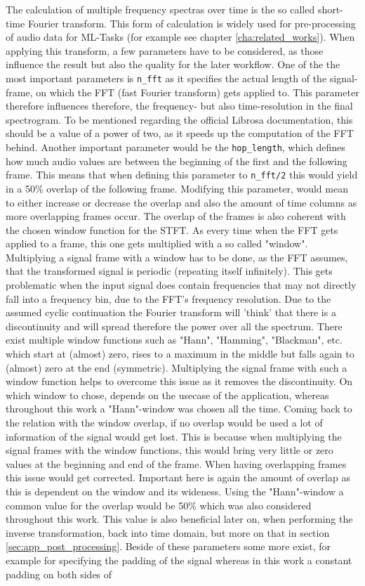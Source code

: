 The calculation of multiple frequency spectras over time is the so called short-time Fourier transform. This form of calculation is widely used for pre-processing of audio data for ML-Tasks (for example see chapter \ref{cha:related_works}). When applying this transform, a few parameters have to be considered, as those influence the result but also the quality for the later workflow. One of the the most important parameters is \texttt{n\_fft} as it specifies the actual length of the signal-frame, on which the FFT (fast Fourier transform) gets applied to. This parameter therefore influences therefore, the frequency- but also time-resolution in the final spectrogram. To be mentioned regarding the official Librosa documentation, this should be a value of a power of two, as it speeds up the computation of the FFT behind. Another important parameter would be the \texttt{hop\_length}, which defines how much audio values are between the beginning of the first and the following frame. This means that when defining this parameter to \texttt{n\_fft/2} this would yield in a 50\% overlap of the following frame. Modifying this parameter, would mean to either increase or decrease the overlap and also the amount of time columns as more overlapping frames occur. The overlap of the frames is also coherent with the chosen window function for the STFT. As every time when the FFT gets applied to a frame, this one gets multiplied with a so called "window". Multiplying a signal frame with a window has to be done, as the FFT assumes, that the transformed signal is periodic (repeating itself infinitely). \cite{heinzel2002spectrum} This gets problematic when the input signal does contain frequencies that may not directly fall into a frequency bin, due to the FFT's frequency resolution. Due to the assumed cyclic continuation the Fourier transform will 'think' that there is a discontinuity and will spread therefore the power over all the spectrum. There exist multiple window functions such as "Hann", "Hamming", "Blackman", etc. which start at (almost) zero, rises to a maximum in the middle but falls again to (almost) zero at the end (symmetric). Multiplying the signal frame with such a window function helps to overcome this issue as it removes the discontinuity. On which window to chose, depends on the usecase of the application, whereas throughout this work a "Hann"-window was chosen all the time. Coming back to the relation with the window overlap, if no overlap would be used a lot of information of the signal would get lost. This is because when multiplying the signal frames with the window functions, this would bring very little or zero values at the beginning and end of the frame. \cite{heinzel2002spectrum} When having overlapping frames this issue would get corrected. Important here is again the amount of overlap as this is dependent on the window and its wideness. Using the "Hann"-window a common value for the overlap would be 50\% which was also considered throughout this work. This value is also beneficial later on, when performing the inverse transformation, back into time domain, but more on that in section \ref{sec:app_post_processing}. Beside of these parameters some more exist, for example for specifying the padding of the signal whereas in this work a constant padding on both sides of 